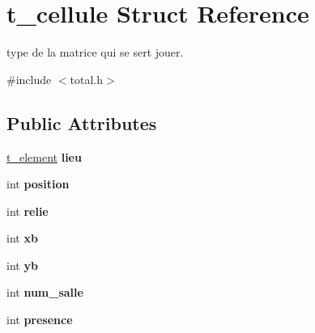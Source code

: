\hypertarget{structt__cellule}{}\section{t\+\_\+cellule Struct Reference}
\label{structt__cellule}


type de la matrice qui se sert jouer.  




{\ttfamily \#include $<$total.\+h$>$}

\subsection*{Public Attributes}
\begin{DoxyCompactItemize}
\item 
\hyperlink{total_8h_a8b071baf43ce73c99f88fc8169b0514d}{t\+\_\+element} {\bfseries lieu}\hypertarget{structt__cellule_acc90c92f8e818d09c854228459a0ab22}{}\label{structt__cellule_acc90c92f8e818d09c854228459a0ab22}

\item 
int {\bfseries position}\hypertarget{structt__cellule_a5e1ccabc00cb0d0408227098303c202f}{}\label{structt__cellule_a5e1ccabc00cb0d0408227098303c202f}

\item 
int {\bfseries relie}\hypertarget{structt__cellule_af9dbc60de1329863b1bae065e31fe8bf}{}\label{structt__cellule_af9dbc60de1329863b1bae065e31fe8bf}

\item 
int {\bfseries xb}\hypertarget{structt__cellule_a5183498db3cf4a0f5850dafd8bbb7247}{}\label{structt__cellule_a5183498db3cf4a0f5850dafd8bbb7247}

\item 
int {\bfseries yb}\hypertarget{structt__cellule_a3f76a3701e3261c07cd0ab76556f3d77}{}\label{structt__cellule_a3f76a3701e3261c07cd0ab76556f3d77}

\item 
int {\bfseries num\+\_\+salle}\hypertarget{structt__cellule_a2342d5f65d1caac334a6e32095992a64}{}\label{structt__cellule_a2342d5f65d1caac334a6e32095992a64}

\item 
int {\bfseries presence}\hypertarget{structt__cellule_abfd3c5804afeb49a5d11c20e0d3c38b9}{}\label{structt__cellule_abfd3c5804afeb49a5d11c20e0d3c38b9}

\end{DoxyCompactItemize}


